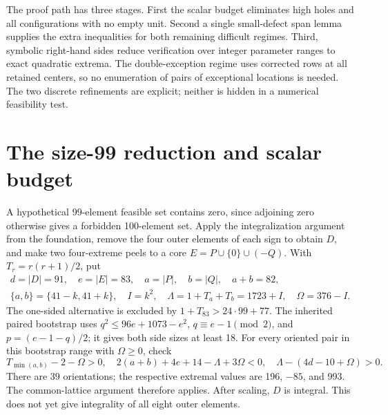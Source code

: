 \documentclass[11pt,a4paper]{article}
\begin{document}
The proof path has three stages. First the scalar budget eliminates high
holes and all configurations with no empty unit. Second a single
small-defect span lemma supplies the extra inequalities for both
remaining difficult regimes. Third, symbolic right-hand sides reduce
verification over integer parameter ranges to exact quadratic extrema.
The double-exception regime uses corrected rows at all retained centers,
so no enumeration of pairs of exceptional locations is needed.
The two discrete refinements are explicit; neither is hidden in a
numerical feasibility test.

\section{The size-99 reduction and scalar budget}
A hypothetical 99-element feasible set contains zero, since adjoining
zero otherwise gives a forbidden 100-element set. Apply the integralization
argument from the foundation, remove the four outer elements of each
sign to obtain $D$, and make two four-extreme peels to a core
$E=P\cup\{0\}\cup(-Q)$. With $T_r=r(r+1)/2$, put
\begin{gather*}
 d=|D|=91,\quad e=|E|=83,\quad a=|P|,\quad b=|Q|,\quad a+b=82,\\
 \{a,b\}=\{41-k,41+k\},\quad I=k^2,\quad
 \Lambda=1+T_a+T_b=1723+I,\quad\Omega=376-I.
\end{gather*}
The one-sided alternative is excluded by $1+T_{83}>24\cdot99+77$.
The inherited paired bootstrap uses
$q^2\le96e+1073-e^2$, $q\equiv e-1\pmod2$, and
$p=(e-1-q)/2$; it gives both side sizes at least 18.
For every oriented pair in this bootstrap range with $\Omega\ge0$, check
\begin{equation}\label{eq:gates}
 T_{\min(a,b)}-2-\Omega>0,\quad
 2(a+b)+4e+14-\Lambda+3\Omega<0,\quad
 \Lambda-(4d-10+\Omega)>0.
\end{equation}
There are 39 orientations; the respective extremal values are
196, $-85$, and 993. The common-lattice argument therefore applies.
After scaling, $D$ is integral. This does not yet give integrality of
all eight outer elements.
\end{document}
